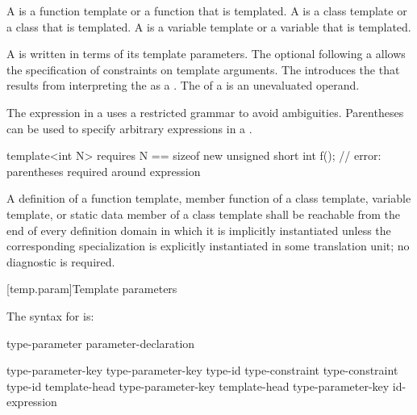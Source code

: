 A  is
a function template or a function that is templated.
A  is
a class template or a class that is templated.
A  is
a variable template or a variable that is templated.

\pnum
A  is written
in terms of its template parameters.
The optional  following a
 allows the specification of
constraints on template arguments.
The  introduces the
 that results from interpreting
the  as a
.
The  of a
 is an unevaluated operand.
\begin{note}
The expression in a 
uses a restricted grammar to avoid ambiguities.
Parentheses can be used to specify arbitrary expressions
in a .
\begin{example}
\begin{codeblock}
template<int N> requires N == sizeof new unsigned short
int f();            // error: parentheses required around \tcode{==} expression
\end{codeblock}
\end{example}
\end{note}

\pnum
A definition of
a function template,
member function of a class template,
variable template,
or static data member of a class template
shall be reachable from the end of every definition domain
in which it is implicitly instantiated unless the
corresponding specialization is explicitly instantiated
in some translation unit; no diagnostic is required.

[temp.param]{Template parameters}

\pnum
The syntax for
is:

\begin{bnf}
\br
  type-parameter\br
  parameter-declaration
\end{bnf}

\begin{bnf}
\br
  type-parameter-key  \br
  type-parameter-key  \terminal{=} type-id\br
  type-constraint  \br
  type-constraint  \terminal{=} type-id\br
  template-head type-parameter-key  \br
  template-head type-parameter-key  \terminal{=} id-expression
\end{bnf}

